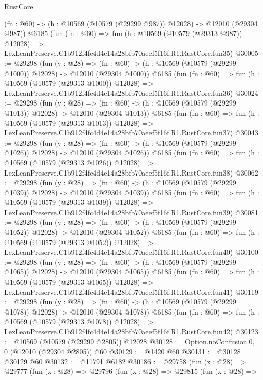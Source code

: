 \begin{lexlean}{RustCore}
\begin{coremodule}
    (fn : @60) -> (h : @10569 (@10579 (@29299 @987)) @12028) -> @12010 (@29304 @987))
    @6185
    (fun (fn : @60) =>
    fun (h : @10569 (@10579 (@29313 @987)) @12028) =>
    LexLeanPreserve.C1b912f4fc4d4e14a28bfb70aeef5f16f.R1.RustCore.fun35)
@30005 := @29298
    (fun (y : @28) =>
    (fn : @60) -> (h : @10569 (@10579 (@29299 @1000)) @12028) -> @12010 (@29304 @1000))
    @6185
    (fun (fn : @60) =>
    fun (h : @10569 (@10579 (@29313 @1000)) @12028) =>
    LexLeanPreserve.C1b912f4fc4d4e14a28bfb70aeef5f16f.R1.RustCore.fun36)
@30024 := @29298
    (fun (y : @28) =>
    (fn : @60) -> (h : @10569 (@10579 (@29299 @1013)) @12028) -> @12010 (@29304 @1013))
    @6185
    (fun (fn : @60) =>
    fun (h : @10569 (@10579 (@29313 @1013)) @12028) =>
    LexLeanPreserve.C1b912f4fc4d4e14a28bfb70aeef5f16f.R1.RustCore.fun37)
@30043 := @29298
    (fun (y : @28) =>
    (fn : @60) -> (h : @10569 (@10579 (@29299 @1026)) @12028) -> @12010 (@29304 @1026))
    @6185
    (fun (fn : @60) =>
    fun (h : @10569 (@10579 (@29313 @1026)) @12028) =>
    LexLeanPreserve.C1b912f4fc4d4e14a28bfb70aeef5f16f.R1.RustCore.fun38)
@30062 := @29298
    (fun (y : @28) =>
    (fn : @60) -> (h : @10569 (@10579 (@29299 @1039)) @12028) -> @12010 (@29304 @1039))
    @6185
    (fun (fn : @60) =>
    fun (h : @10569 (@10579 (@29313 @1039)) @12028) =>
    LexLeanPreserve.C1b912f4fc4d4e14a28bfb70aeef5f16f.R1.RustCore.fun39)
@30081 := @29298
    (fun (y : @28) =>
    (fn : @60) -> (h : @10569 (@10579 (@29299 @1052)) @12028) -> @12010 (@29304 @1052))
    @6185
    (fun (fn : @60) =>
    fun (h : @10569 (@10579 (@29313 @1052)) @12028) =>
    LexLeanPreserve.C1b912f4fc4d4e14a28bfb70aeef5f16f.R1.RustCore.fun40)
@30100 := @29298
    (fun (y : @28) =>
    (fn : @60) -> (h : @10569 (@10579 (@29299 @1065)) @12028) -> @12010 (@29304 @1065))
    @6185
    (fun (fn : @60) =>
    fun (h : @10569 (@10579 (@29313 @1065)) @12028) =>
    LexLeanPreserve.C1b912f4fc4d4e14a28bfb70aeef5f16f.R1.RustCore.fun41)
@30119 := @29298
    (fun (y : @28) =>
    (fn : @60) -> (h : @10569 (@10579 (@29299 @1078)) @12028) -> @12010 (@29304 @1078))
    @6185
    (fun (fn : @60) =>
    fun (h : @10569 (@10579 (@29313 @1078)) @12028) =>
    LexLeanPreserve.C1b912f4fc4d4e14a28bfb70aeef5f16f.R1.RustCore.fun42)
@30123 := @10569 (@10579 (@29299 @2805)) @12028
@30128 := Option.noConfusion.{0, 0} (@12010 (@29304 @2805)) @60
@30129 := @1420 @60
@30131 := @30128 @30129 @60
@30132 := @11791 @6182
@30186 := @29758
    (fun (x : @28) =>
    @29777
      (fun (x : @28) =>
      @29796
        (fun (x : @28) =>
        @29815
          (fun (x : @28) =>

\end{coremodule}
\end{lexlean}
